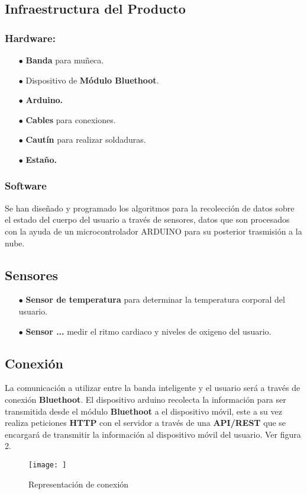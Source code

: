 \documentclass[osajnl,twocolumn,showpacs,superscriptaddress,10pt]{revtex4-1}
\begin{document}
\subsection{Infraestructura del Producto}
\subsubsection{Hardware:}
\begin{itemize}
    \item[$\bullet$]\textbf{Banda} para muñeca.
    \item[$\bullet$]Dispositivo de \textbf{Módulo Bluethoot}.
    \item[$\bullet$]\textbf{Arduino.}
    \item[$\bullet$]\textbf{Cables} para conexiones.
    \item[$\bullet$]\textbf{Cautín} para realizar soldaduras.
    \item[$\bullet$]\textbf{Estaño.}
\end{itemize}
\subsubsection{Software}
    Se han diseñado y programado los algoritmos para la recolección de datos sobre el estado del cuerpo del usuario a través de sensores, datos que son procesados con la ayuda de un microcontrolador ARDUINO para su posterior trasmisión a la nube.
    
\subsection{Sensores}
\begin{itemize}
    \item[$\bullet$]\textbf{Sensor de temperatura} para determinar la temperatura corporal del usuario.
    \item[$\bullet$]\textbf{Sensor ...} medir el ritmo cardiaco y niveles de oxigeno del usuario.
\end{itemize}
\subsection{Conexión}
    La comunicación a utilizar entre la banda inteligente y el usuario será a través de conexión \textbf{Bluethoot}. El dispositivo arduino recolecta la información para ser transmitida desde el módulo \textbf{Bluethoot} a el dispositivo móvil, este a su vez realiza peticiones \textbf{HTTP} con el servidor a través de una \textbf{API/REST} que se encargará de transmitir la información al dispositivo móvil del usuario. Ver figura 2. \newline
\begin{figure} [H] \centering 
\caption{Representación de conexión}

\texttt{[image: ]} 
\end{figure}
\end{document}
